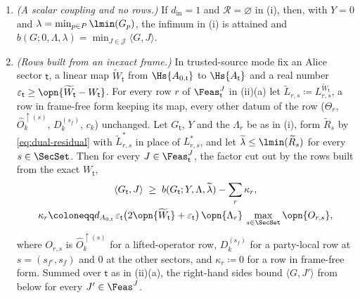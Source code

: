 \begin{lemma}
\begin{enumerate}[label=(\roman*),leftmargin=2.2em]
\begin{enumerate}[label=(\alph*),leftmargin=2.2em]
    place of $W_{\mathsf t}$, its maps vanishing outside the joint sectors
    $(\mathsf t,(s_{f^c},s_f))$. Hence
    $b(G;y,\Lambda,\lambda)\le\langle G,J'\rangle$ for every
    $J'\in\Feas^{J}$, the whole list being one set of the form of (i).
  \end{enumerate}
\item \emph{(A scalar coupling and no rows.)} If $d_{\mathrm{in}}=1$ and
  $\mathcal{R}=\varnothing$ in (i), then, with $Y=0$ and
  $\lambda=\min_{p\in P}\lmin(G_p)$, the infimum in (i) is attained and
  $b(G;0,\Lambda,\lambda)=\min_{J\in\mathcal{J}}\langle G,J\rangle$.
\item \emph{(Rows built from an inexact frame.)} In trusted-source mode fix
  an Alice sector $\mathsf t$, a linear map $\widetilde W_{\mathsf t}$ from
  $\Hs{A_{0,\mathsf t}}$ to $\Hs{A_{\mathsf t}}$ and a real number
  $\varepsilon_{\mathsf t}\ge\opn{\widetilde W_{\mathsf t}-W_{\mathsf t}}$.
  For every row $r$ of $\Feas^{J}_{\mathsf t}$ in (ii)(a) let
  $\widetilde L_{r,s}\coloneqq L^{\widetilde W_{\mathsf t}}_{r,s}$, a row in
  frame-free form keeping its map, every other datum of the row
  ($\Theta_r$, $\hat O^{\uparrow(s)}_k$, $D^{(s_f)}_k$, $c_k$) unchanged. Let
  $G_{\mathsf t}$, $Y$ and the $\Lambda_r$ be as in (i), form
  $\widetilde R_s$ by \eqref{eq:dual-residual} with
  $\widetilde L^{*}_{r,s}$ in place of $L^{*}_{r,s}$, and let
  $\widetilde\lambda\le\lmin(\widetilde R_s)$ for every $s\in\SecSet$. Then
  for every $J\in\Feas^{J}_{\mathsf t}$, the factor cut out by the rows
  built from the exact $W_{\mathsf t}$,
  \begin{equation}\label{eq:frame-deficit}
    \begin{gathered}
    \langle G_{\mathsf t},J\rangle\;\ge\;
    b(G_{\mathsf t};Y,\Lambda,\widetilde\lambda)-\sum_{r}\kappa_r,\\
    \kappa_r\coloneqq d_{A_{0,\mathsf t}}\,\varepsilon_{\mathsf t}
    \big(2\opn{\widetilde W_{\mathsf t}}+\varepsilon_{\mathsf t}\big)\,
    \opn{\Lambda_r}\,\max_{s\in\SecSet}\opn{O_{r,s}},
    \end{gathered}
  \end{equation}
  where $O_{r,s}$ is $\hat O^{\uparrow(s)}_k$ for a lifted-operator row,
  $D^{(s_f)}_k$ for a party-local row at $s=(s_{f^c},s_f)$ and $0$ at the
  other sectors, and $\kappa_r\coloneqq0$ for a row in frame-free form.
  Summed over $\mathsf t$ as in (ii)(a), the right-hand sides bound
  $\langle G,J'\rangle$ from below for every $J'\in\Feas^{J}$.
\end{enumerate}
\end{lemma}

